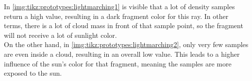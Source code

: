 \begin{figure}[H]
    \label{img:tikz:prototypes:lightmarching1}
\end{figure}

\noindent
In \autoref{img:tikz:prototypes:lightmarching1} is visible that a lot of density samples return a high value, resulting in a dark \gls{fragment} color for this ray.
In other terms, there is a lot of cloud mass in front of that sample point, so the fragment will not receive a lot of sunlight color.
\\
On the other hand, in \autoref{img:tikz:prototypes:lightmarching2}, only very few samples are even inside a cloud, resulting in an overall low value.
This leads to a higher influence of the sun's color for that \gls{fragment}, meaning the samples are more exposed to the sun.

